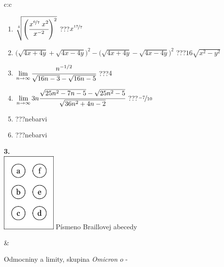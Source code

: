 \documentclass[10pt]{report}
\newcommand\omicron{o}
\begin{document}
\begin{tabular}{c:c}
\begin{minipage}[c][104.5mm][t]{0.5\linewidth}
\begin{center}
\begin{minipage}{0.79\linewidth}
\begin{center}
\begin{varwidth}{\linewidth}
\begin{enumerate}
\small
\item $\sqrt[4]{\left(\cfrac{x^{\nicefrac{6}{7}}\;x^{2}}{x^{-2}}\right)^{2}}$\quad \dotfill\; ???\;\dotfill \quad $x^{\nicefrac{17}{7}}$
\item {\footnotesize{\scriptsize$\big(\sqrt{4x+4y}+\sqrt{4x-4y}\big)^2-\big(\sqrt{4x+4y}-\sqrt{4x-4y}\big)^2$}\quad \dotfill\; ???\;\dotfill \quad $16\sqrt{x^2-y^2}$}
\item $\lim\limits_{n\to\infty}\cfrac{n^{-1/2}}{\sqrt{16n-3}-\sqrt{16n-5}}$\quad \dotfill\; ???\;\dotfill \quad $4$
\item $\lim\limits_{n\to\infty}3n\cfrac{\sqrt{25n^2-7n-5}-\sqrt{25n^2-5}}{\sqrt{36n^2+4n-2}}$\quad \dotfill\; ???\;\dotfill \quad $\nicefrac{-7}{10}$
\item \quad \dotfill\; ???\;\dotfill \quad nebarvi
\item \quad \dotfill\; ???\;\dotfill \quad nebarvi
\end{enumerate}
\end{varwidth}
\end{center}
\end{minipage}
\begin{minipage}{0.20\linewidth}
\begin{center}
{\Huge\bfseries 3.} \\[2mm]
\includegraphics[height=40mm]{../images/braille.png}
{\small Písmeno Braillovej abecedy}
\end{center}
\end{minipage}
\end{center}
\end{minipage}
&
\begin{minipage}[c][104.5mm][t]{0.5\linewidth}
\begin{center}
\vspace{7mm}
{\huge Odmocniny a limity, skupina \textit{Omicron $\omicron$} -}\\[5mm]

\end{center}
\end{minipage}
\end{tabular}
\end{document}
